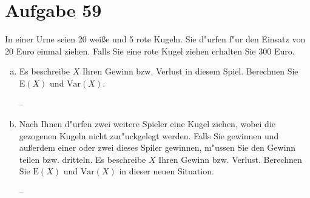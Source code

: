 \section{Aufgabe 59}
\setcounter{section}{59}

In einer Urne seien 20 wei{\ss}e und 5 rote Kugeln. Sie d"urfen f"ur den
Einsatz von 20 Euro einmal ziehen. Falls Sie eine rote Kugel ziehen erhalten
Sie 300 Euro.
\begin{enumerate}[(a)]
    \item Es beschreibe $X$ Ihren Gewinn bzw. Verlust in diesem Spiel.
        Berechnen Sie $\text{E}(X)$ und $\text{Var}(X)$.

        --
    \item Nach Ihnen d"urfen zwei weitere Spieler eine Kugel ziehen, wobei die
        gezogenen Kugeln nicht zur"uckgelegt werden. Falls Sie gewinnen und
        au{\ss}erdem einer oder zwei dieses Spiler gewinnen, m"ussen Sie den
        Gewinn teilen bzw. dritteln. Es beschreibe $X$ Ihren Gewinn bzw. Verlust.
        Berechnen Sie $\text{E}(X)$ und $\text{Var}(X)$ in dieser neuen Situation.

        --
\end{enumerate}
